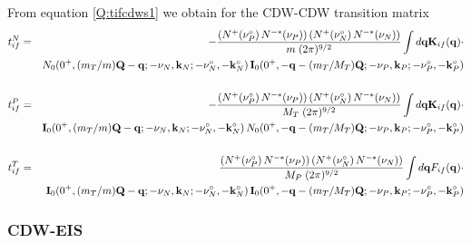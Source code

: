 From equation \ref{Q:tifcdws1} we obtain for the CDW-CDW transition
matrix
\begin{eqnarray}\label{Q:tn_if}
t^{N}_{if}&=& -\frac{\left( N^{+}(\nu_{P}^{\circ})\,N^{-*}(\nu_{P}) \right)
\left( N^{+}(\nu_{N}^{\circ})\,N^{-*}(\nu_{N}) \right)}{m \; (2 \pi)^{9/2}}
\int d \mathbf{q} \mathbf{K}_{if}(\mathbf{q}) \cdot
  \\
&& N_{0}(0^{+}, (m_{T}/m)\mathbf{Q} - \mathbf{q}; -\nu_{N}, \mathbf{k}_{N};
-\nu_{N}^{\circ}, -\mathbf{k}_{N}^{\circ} ) \, \mathbf{I}_{0}( 0^{+} ,
-\mathbf{q}-(m_{T}/M_{T})\mathbf{Q};-\nu_{P},\mathbf{k}_{P}; -\nu_{P}^{\circ},
-\mathbf{k}_{P}^{\circ}) \nonumber
\\
\nonumber \\
t^{P}_{if}&=& -\frac{\left( N^{+}(\nu_{P}^{\circ})\,N^{-*}(\nu_{P}) \right)
\left( N^{+}(\nu_{N}^{\circ})\,N^{-*}(\nu_{N}) \right)}{M_{T} \; (2
\pi)^{9/2}} \int d \mathbf{q} \mathbf{K}_{if}(\mathbf{q}) \cdot
  \\
&& \mathbf{I}_{0}(0^{+}, (m_{T}/m)\mathbf{Q} - \mathbf{q}; -\nu_{N}, \mathbf{k}_{N} ;
-\nu_{N}^{\circ}, -\mathbf{k}_{N}^{\circ}) \, N_{0}( 0^{+} ,
-\mathbf{q}-(m_{T}/M_{T})\mathbf{Q};-\nu_{P},\mathbf{k}_{P}; -\nu_{P}^{\circ},
-\mathbf{k}_{P}^{\circ}) \nonumber
\\
\nonumber \\
t^{T}_{if}&=& \frac{\left( N^{+}(\nu_{P}^{\circ})\,N^{-*}(\nu_{P}) \right)
\left( N^{+}(\nu_{N}^{\circ})\,N^{-*}(\nu_{N}) \right)}{M_{P} \; (2
\pi)^{9/2}} \int d \mathbf{q} F_{if}(\mathbf{q}) \cdot
  \\
&& \mathbf{I}_{0}(0^{+}, (m_{T}/m)\mathbf{Q} - \mathbf{q}; -\nu_{N}, \mathbf{k}_{N};
-\nu_{N}^{\circ}, -\mathbf{k}_{N}^{\circ} ) \, \mathbf{I}_{0}( 0^{+} , -\mathbf{q} -
(m_{T}/M_{T})\mathbf{Q} ; - \nu_{P}, \mathbf{k}_{P}; -\nu_{P}^{\circ}, - \mathbf{k}_{P}^{\circ} )
\nonumber
\end{eqnarray}

\subsubsection{CDW-EIS}

